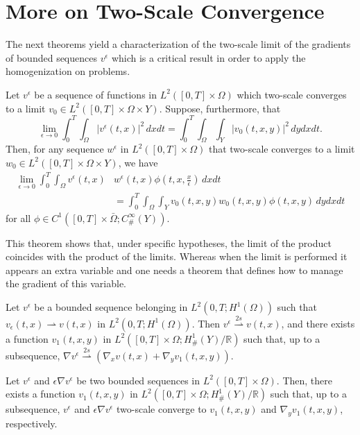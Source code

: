 \section{More on Two-Scale Convergence}\label{appendix:b}
The next theorems yield a characterization of the two-scale limit of the gradients of bounded sequences $v^{\epsilon}$ which is a critical result in order to apply the homogenization on problems.
\begin{theorem}
Let $v^{\epsilon}$ be a sequence of functions in $L^{2}([0, T] \times \Omega)$ which two-scale converges to a limit $v_{0} \in L^{2}([0, T] \times \Omega \times Y)$. Suppose, furthermore, that
$$
\lim _{\epsilon \rightarrow 0} \int_{0}^{T} \int_{\Omega}\left|v^{\epsilon}(t, x)\right|^{2} \, dxdt=\int_{0}^{T} \int_{\Omega} \int_{Y}\left|v_{0}(t, x, y)\right|^{2} \, dy dx dt.
$$
Then, for any sequence $w^{\epsilon}$ in $L^{2}([0, T] \times \Omega)$ that two-scale converges to a limit $w_{0} \in L^{2}([0, T] \times \Omega \times Y)$, we have
$$
\begin{aligned}
\lim _{\epsilon \rightarrow 0} \int_{0}^{T} \int_{\Omega} v^{\epsilon}(t, x) & w^{\epsilon}(t, x) \phi\left(t, x, \frac{x}{\epsilon}\right) \, dxdt \\
&=\int_{0}^{T} \int_{\Omega} \int_{Y} v_{0}(t, x, y) w_{0}(t, x, y) \phi(t, x, y) \, dy dx dt
\end{aligned}
$$for all $\phi \in C^{1}\left([0, T] \times \bar{\Omega} ; C_{\#}^{\infty}(Y)\right)$.
\label{thm 7.2}\end{theorem}
This theorem shows that, under specific hypotheses, the limit of the product coincides with the product of the limits. Whereas when the limit is performed it appears an extra variable and one needs a theorem that defines how to manage the gradient of this variable.
\begin{theorem}
Let $v^{\epsilon}$ be a bounded sequence belonging in $L^{2}\left(0, T ; H^{1}(\Omega)\right)$ such that $v_{\epsilon}(t,x)\rightharpoonup v(t,x)$  in $L^{2}\left(0, T ; H^{1}(\Omega)\right)$. Then $v^{\epsilon} \overset{2s}{\rightharpoonup} v(t, x)$, and there exists a function $v_{1}(t, x, y)$ in $L^{2}\left([0, T] \times \Omega ; H_{\#}^{1}(Y) / \mathbb{R}\right)$ such that, up to a subsequence, $\nabla v^{\epsilon}  \overset{2s}{\rightharpoonup} \left(\nabla_{x} v(t, x)+\nabla_{y} v_{1}(t, x, y)\right)$. 
\label{thm 7.3}\end{theorem}
\begin{theorem} Let $v^{\epsilon}$ and $\epsilon \nabla v^{\epsilon}$ be two bounded sequences in $L^{2}([0, T] \times \Omega)$. Then, there exists a function $v_{1}(t, x, y)$ in $L^{2}\left([0, T] \times \Omega ; H_{\#}^{1}(Y) / \mathbb{R}\right)$ such that, up to a subsequence, $v^{\epsilon}$ and $\epsilon \nabla v^{\epsilon}$ two-scale converge to $v_{1}(t, x, y)$ and $\nabla_{y} v_{1}(t, x, y)$, respectively.
\label{theorem 7.4}\end{theorem}
